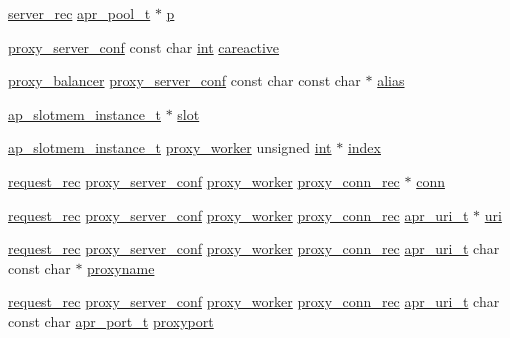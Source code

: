 \begin{DoxyCompactItemize}
\item 
\hyperlink{structserver__rec}{server\+\_\+rec} \hyperlink{structapr__pool__t}{apr\+\_\+pool\+\_\+t} $\ast$ \hyperlink{group__MOD__PROXY_ga2b87ce5c0cd5c5aa97fd3ba98460ab16}{p}
\item 
\hyperlink{structproxy__server__conf}{proxy\+\_\+server\+\_\+conf} const char \hyperlink{pcre_8txt_a42dfa4ff673c82d8efe7144098fbc198}{int} \hyperlink{group__MOD__PROXY_ga907a0511ba7126274d551c5c89f7cd25}{careactive}
\item 
\hyperlink{structproxy__balancer}{proxy\+\_\+balancer} \hyperlink{structproxy__server__conf}{proxy\+\_\+server\+\_\+conf} const char const char $\ast$ \hyperlink{group__MOD__PROXY_ga7f4ea7c234f98eb8a540edb42cea1be0}{alias}
\item 
\hyperlink{structap__slotmem__instance__t}{ap\+\_\+slotmem\+\_\+instance\+\_\+t} $\ast$ \hyperlink{group__MOD__PROXY_ga272f60c5e6cce1bfc743cd17b683d5a3}{slot}
\item 
\hyperlink{structap__slotmem__instance__t}{ap\+\_\+slotmem\+\_\+instance\+\_\+t} \hyperlink{structproxy__worker}{proxy\+\_\+worker} unsigned \hyperlink{pcre_8txt_a42dfa4ff673c82d8efe7144098fbc198}{int} $\ast$ \hyperlink{group__MOD__PROXY_ga91d14f06ae407fcabb40429882cfee96}{index}
\item 
\hyperlink{structrequest__rec}{request\+\_\+rec} \hyperlink{structproxy__server__conf}{proxy\+\_\+server\+\_\+conf} \hyperlink{structproxy__worker}{proxy\+\_\+worker} \hyperlink{structproxy__conn__rec}{proxy\+\_\+conn\+\_\+rec} $\ast$ \hyperlink{group__MOD__PROXY_gaf26a520a5f2c0d567cd7732f04c925c2}{conn}
\item 
\hyperlink{structrequest__rec}{request\+\_\+rec} \hyperlink{structproxy__server__conf}{proxy\+\_\+server\+\_\+conf} \hyperlink{structproxy__worker}{proxy\+\_\+worker} \hyperlink{structproxy__conn__rec}{proxy\+\_\+conn\+\_\+rec} \hyperlink{structapr__uri__t}{apr\+\_\+uri\+\_\+t} $\ast$ \hyperlink{group__MOD__PROXY_gabc22c03ae1feb0b4ea1efdd3eef4c964}{uri}
\item 
\hyperlink{structrequest__rec}{request\+\_\+rec} \hyperlink{structproxy__server__conf}{proxy\+\_\+server\+\_\+conf} \hyperlink{structproxy__worker}{proxy\+\_\+worker} \hyperlink{structproxy__conn__rec}{proxy\+\_\+conn\+\_\+rec} \hyperlink{structapr__uri__t}{apr\+\_\+uri\+\_\+t} char const char $\ast$ \hyperlink{group__MOD__PROXY_gaa1c038713fefa564c88a58477a1b2001}{proxyname}
\item 
\hyperlink{structrequest__rec}{request\+\_\+rec} \hyperlink{structproxy__server__conf}{proxy\+\_\+server\+\_\+conf} \hyperlink{structproxy__worker}{proxy\+\_\+worker} \hyperlink{structproxy__conn__rec}{proxy\+\_\+conn\+\_\+rec} \hyperlink{structapr__uri__t}{apr\+\_\+uri\+\_\+t} char const char \hyperlink{group__apr__network__io_gaa670a71960f6eb4fe0d0de2a1e7aba03}{apr\+\_\+port\+\_\+t} \hyperlink{group__MOD__PROXY_ga9913582faaffe156d1b3b9330f5d0e6e}{proxyport}

\end{DoxyCompactItemize}
